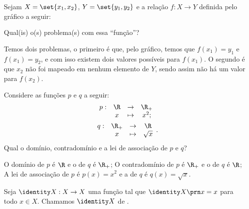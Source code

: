 \begin{example}
Sejam $X = \set{x_1, x_2}$, $Y = \set{y_1, y_2}$ e a relação $f : X \to Y$ definida pelo gráfico a seguir:
\begin{center}
     
\end{center}
Qual(is) o(s) problema(s) com essa ``função''?
\end{example}
\begin{solution}
Temos dois problemas, o primeiro é que, pelo gráfico, temos que $f(x_1) = y_1$ e $f(x_1) = y_2$, e com isso existem dois valores possíveis para $f(x_1)$. O segundo é que $x_2$ não foi mapeado em nenhum elemento de $Y$, sendo assim não há um valor para $f(x_2)$.
\end{solution}


\begin{example}
\label{example:func-sq-sqrt}
Considere as funções $p$ e $q$ a seguir:
%
\begin{gather*}
\begin{array}{cccc}
p : & \R & \to     & \R_+ \\
     &  x & \mapsto & x^2;
\end{array}\\
\begin{array}{cccc}
q : & \R_+ & \to     & \R \\
     &  x & \mapsto & \sqrt x
\end{array}.
\end{gather*}
%
Qual o domínio, contradomínio e a lei de associação de $p$ e $q$?
\end{example}

\begin{solution}
O domínio de $p$ é $\R$ e o de $q$ é $\R_+$; 
O contradomínio de $p$ é $\R_+$ e o de $q$ é $\R$; 
A lei de associação de $p$ é $p(x)=x^2$ e a de $q$ é $q(x)=\sqrt x$.
\end{solution}

\begin{definition}
Seja $\identity X : X \to X $ uma função tal que $\identity X \prn x = x$ para todo $x \in X$. Chamamos $\identity X$ de .
\end{definition}